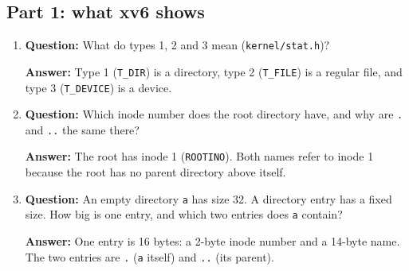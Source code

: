 \documentclass[12pt]{article}
\begin{document}
\subsection{Part 1: what xv6 shows}
\begin{enumerate}
\item \textbf{Question:} What do types 1, 2 and 3 mean (\texttt{kernel/stat.h})?
\par\textbf{Answer:} Type 1 (\texttt{T\_DIR}) is a directory, type 2 (\texttt{T\_FILE}) is a regular file, and type 3 (\texttt{T\_DEVICE}) is a device.

\item \textbf{Question:} Which inode number does the root directory have, and why are \texttt{.} and \texttt{..} the same there?
\par\textbf{Answer:} The root has inode 1 (\texttt{ROOTINO}). Both names refer to inode 1 because the root has no parent directory above itself.

\item \textbf{Question:} An empty directory \texttt{a} has size 32. A directory entry has a fixed size. How big is one entry, and which two entries does \texttt{a} contain?
\par\textbf{Answer:} One entry is 16 bytes: a 2-byte inode number and a 14-byte name. The two entries are \texttt{.} (\texttt{a} itself) and \texttt{..} (its parent).
\end{enumerate}
\end{document}
